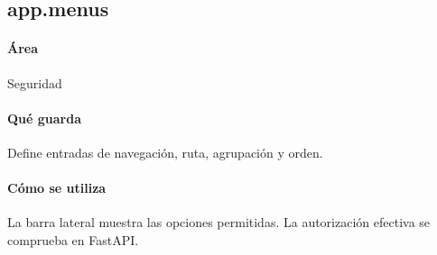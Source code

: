 \subsection{app.menus}
\paragraph{Área} Seguridad

\paragraph{Qué guarda} Define entradas de navegación, ruta, agrupación y orden.

\paragraph{Cómo se utiliza} La barra lateral muestra las opciones permitidas. La autorización efectiva se comprueba en FastAPI.

